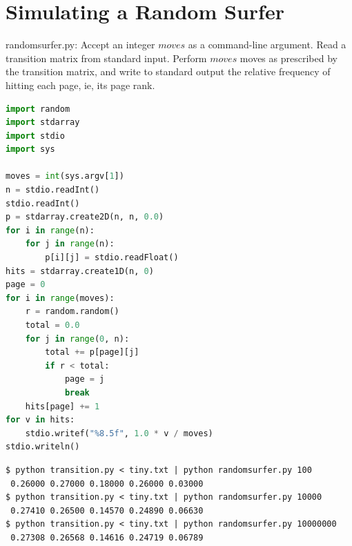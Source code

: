 \documentclass[8pt,a4paper,compress]{beamer}
\begin{document}
\section{Simulating a Random Surfer}
\begin{frame}[fragile]
\pause

\begin{framed}
\tiny randomsurfer.py: Accept an integer $moves$ as a command-line argument. Read a transition matrix from standard input. Perform $moves$ moves as prescribed by the transition matrix, and write to standard output the relative frequency of hitting each page, ie, its page rank.
\end{framed}

\begin{minipage}{170pt}
\begin{lstlisting}[language=Python]
import random
import stdarray
import stdio
import sys

moves = int(sys.argv[1])
n = stdio.readInt()
stdio.readInt()
p = stdarray.create2D(n, n, 0.0)
for i in range(n):
    for j in range(n):
        p[i][j] = stdio.readFloat()
hits = stdarray.create1D(n, 0)
page = 0
for i in range(moves):
    r = random.random()
    total = 0.0
    for j in range(0, n):
        total += p[page][j]
        if r < total:
            page = j
            break
    hits[page] += 1
for v in hits:
    stdio.writef("%8.5f", 1.0 * v / moves)
stdio.writeln()
\end{lstlisting}
\end{minipage}
\begin{minipage}{130pt}
\end{minipage}
\end{frame}

\begin{frame}[fragile]
\pause

\begin{lstlisting}[language={}]
$ python transition.py < tiny.txt | python randomsurfer.py 100
 0.26000 0.27000 0.18000 0.26000 0.03000
$ python transition.py < tiny.txt | python randomsurfer.py 10000
 0.27410 0.26500 0.14570 0.24890 0.06630
$ python transition.py < tiny.txt | python randomsurfer.py 10000000
 0.27308 0.26568 0.14616 0.24719 0.06789
\end{lstlisting}
\end{frame}
\end{document}
